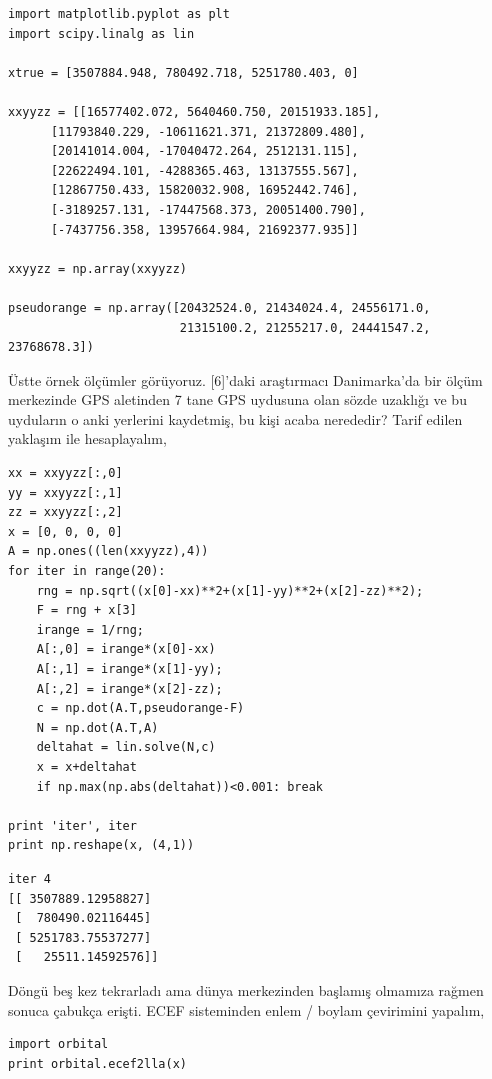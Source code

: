 \documentclass[12pt,fleqn]{article}\usepackage{../../common}
\begin{document}
\begin{verbatim}
import matplotlib.pyplot as plt
import scipy.linalg as lin

xtrue = [3507884.948, 780492.718, 5251780.403, 0]

xxyyzz = [[16577402.072, 5640460.750, 20151933.185],
	  [11793840.229, -10611621.371, 21372809.480],
	  [20141014.004, -17040472.264, 2512131.115],
	  [22622494.101, -4288365.463, 13137555.567],
	  [12867750.433, 15820032.908, 16952442.746],
	  [-3189257.131, -17447568.373, 20051400.790],
	  [-7437756.358, 13957664.984, 21692377.935]]

xxyyzz = np.array(xxyyzz)

pseudorange = np.array([20432524.0, 21434024.4, 24556171.0, 
                        21315100.2, 21255217.0, 24441547.2, 23768678.3])

\end{verbatim}

Üstte örnek ölçümler görüyoruz. [6]'daki araştırmacı Danimarka'da bir ölçüm
merkezinde GPS aletinden 7 tane GPS uydusuna olan sözde uzaklığı ve bu
uyduların o anki yerlerini kaydetmiş, bu kişi acaba nerededir? Tarif edilen
yaklaşım ile hesaplayalım,

\begin{verbatim}
xx = xxyyzz[:,0]
yy = xxyyzz[:,1]
zz = xxyyzz[:,2]
x = [0, 0, 0, 0]
A = np.ones((len(xxyyzz),4))
for iter in range(20):
    rng = np.sqrt((x[0]-xx)**2+(x[1]-yy)**2+(x[2]-zz)**2);
    F = rng + x[3]
    irange = 1/rng;
    A[:,0] = irange*(x[0]-xx)
    A[:,1] = irange*(x[1]-yy);
    A[:,2] = irange*(x[2]-zz);
    c = np.dot(A.T,pseudorange-F)
    N = np.dot(A.T,A)
    deltahat = lin.solve(N,c)
    x = x+deltahat
    if np.max(np.abs(deltahat))<0.001: break

print 'iter', iter
print np.reshape(x, (4,1))
\end{verbatim}

\begin{verbatim}
iter 4
[[ 3507889.12958827]
 [  780490.02116445]
 [ 5251783.75537277]
 [   25511.14592576]]
\end{verbatim}

Döngü beş kez tekrarladı ama dünya merkezinden başlamış olmamıza rağmen
sonuca çabukça erişti. ECEF sisteminden enlem / boylam çevirimini yapalım,

\begin{verbatim}
import orbital
print orbital.ecef2lla(x)
\end{verbatim}
\end{document}

